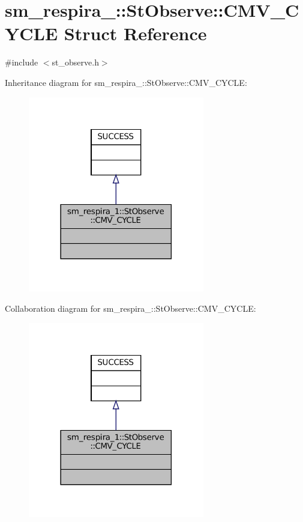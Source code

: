\hypertarget{structsm__respira__1_1_1StObserve_1_1CMV__CYCLE}{}\section{sm\+\_\+respira\+\_\+:\+:St\+Observe\+:\+:C\+M\+V\+\_\+\+C\+Y\+C\+LE Struct Reference}
\label{structsm__respira__1_1_1StObserve_1_1CMV__CYCLE}


{\ttfamily \#include $<$st\+\_\+observe.\+h$>$}



Inheritance diagram for sm\+\_\+respira\+\_\+:\+:St\+Observe\+:\+:C\+M\+V\+\_\+\+C\+Y\+C\+LE\+:
\nopagebreak
\begin{figure}[H]
\begin{center}
\leavevmode
\includegraphics[width=218pt]{structsm__respira__1_1_1StObserve_1_1CMV__CYCLE__inherit__graph}
\end{center}
\end{figure}


Collaboration diagram for sm\+\_\+respira\+\_\+:\+:St\+Observe\+:\+:C\+M\+V\+\_\+\+C\+Y\+C\+LE\+:
\nopagebreak
\begin{figure}[H]
\begin{center}
\leavevmode
\includegraphics[width=218pt]{structsm__respira__1_1_1StObserve_1_1CMV__CYCLE__coll__graph}
\end{center}
\end{figure}


